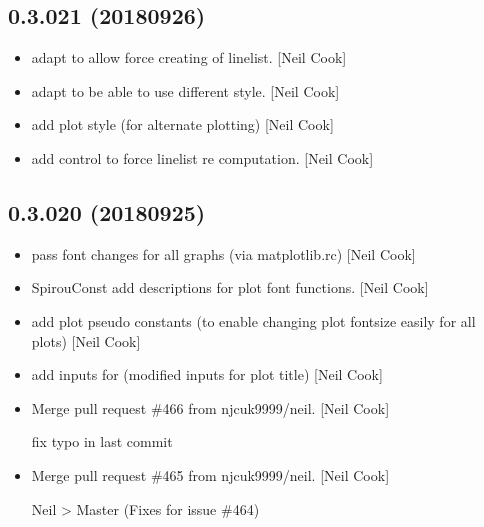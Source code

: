 \documentclass[a4paper,10pt,english]{report}
\begin{document}
\subsection{0.3.021 (2018\sphinxhyphen{}09\sphinxhyphen{}26)}
\label{\detokenize{misc/changelog:id330}}\begin{itemize}
\item {} 
 \sphinxhyphen{} adapt to allow force creating of linelist. {[}Neil Cook{]}

\item {} 
 \sphinxhyphen{} adapt to be able to use different style. {[}Neil Cook{]}

\item {} 
 \sphinxhyphen{} add plot style (for alternate plotting) {[}Neil Cook{]}

\item {} 
 \sphinxhyphen{} add control to force linelist re\sphinxhyphen{}
computation. {[}Neil Cook{]}

\end{itemize}


\subsection{0.3.020 (2018\sphinxhyphen{}09\sphinxhyphen{}25)}
\label{\detokenize{misc/changelog:id331}}\begin{itemize}
\item {} 
 \sphinxhyphen{} pass font changes for all graphs (via matplotlib.rc)
{[}Neil Cook{]}

\item {} 
SpirouConst \sphinxhyphen{} add descriptions for plot font functions. {[}Neil Cook{]}

\item {} 
 \sphinxhyphen{} add plot pseudo constants (to enable changing plot
fontsize easily \sphinxhyphen{} for all plots) {[}Neil Cook{]}

\item {} 
 \sphinxhyphen{} add inputs for  (modified
inputs for plot title) {[}Neil Cook{]}

\item {} 
Merge pull request \#466 from njcuk9999/neil. {[}Neil Cook{]}

fix typo in last commit

\item {} 
Merge pull request \#465 from njcuk9999/neil. {[}Neil Cook{]}

Neil \textendash{}\textgreater{} Master (Fixes for issue \#464)

\end{itemize}
\end{document}
